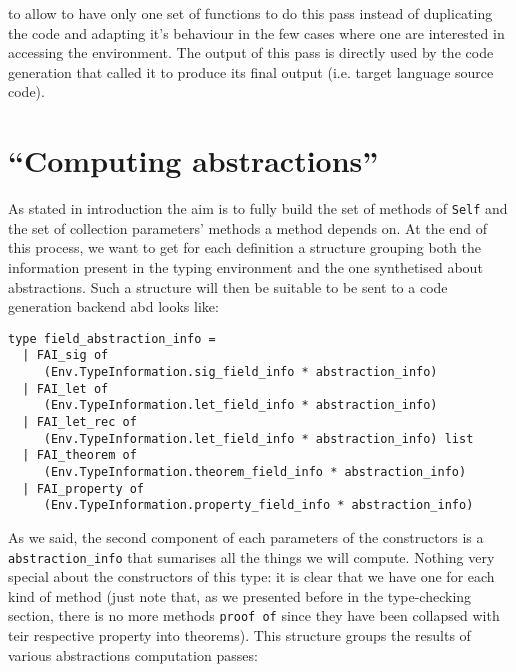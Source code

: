 \noindent to allow to have only one set of functions to do this pass
instead of duplicating the code and adapting it's behaviour in the few
cases where one are interested in accessing the environment. The
output of this pass is directly used by the code generation that
called it to produce its final output (i.e. target language source
code).



\section{``Computing abstractions''}
As stated in introduction the aim is to fully build the set of
methods of {\tt Self} and the set of collection parameters' methods a
method depends on. At the end of this process, we want to get for each
definition a structure grouping both the information present in the
typing environment and the one synthetised about abstractions. Such a
structure will then be suitable to be sent to a code generation
backend abd looks like:

{\footnotesize
\begin{lstlisting}[language=MyOCaml]
type field_abstraction_info =
  | FAI_sig of
     (Env.TypeInformation.sig_field_info * abstraction_info)
  | FAI_let of
     (Env.TypeInformation.let_field_info * abstraction_info)
  | FAI_let_rec of
     (Env.TypeInformation.let_field_info * abstraction_info) list
  | FAI_theorem of
     (Env.TypeInformation.theorem_field_info * abstraction_info)
  | FAI_property of
     (Env.TypeInformation.property_field_info * abstraction_info)
\end{lstlisting}
}

As we said, the second component of each parameters of the
constructors is a {\tt abstraction\_info} that sumarises all the
things we will compute. Nothing very special about the constructors of
this type: it is clear that we have one for each kind of method (just
note that, as we presented before in the type-checking section, there
is no more methods {\tt proof of} since they have been collapsed with
teir respective property into theorems). This structure groups the
results of various abstractions computation passes:

